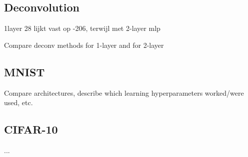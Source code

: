 \subsection{Deconvolution}
1layer 28 lijkt vast op -206, terwijl met 2-layer mlp

Compare deconv methods for 1-layer and for 2-layer


\subsection{MNIST}
Compare architectures, describe which learning hyperparameters worked/were used, etc.

\subsection{CIFAR-10}
...

\newpage
